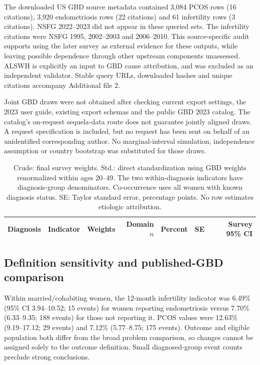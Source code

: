 \documentclass[11pt,a4paper]{article}
\begin{document}
The downloaded US GBD source metadata contained 3,084 PCOS rows (16 citations), 3,920 endometriosis rows (22 citations) and 61 infertility rows (3 citations). NSFG 2022--2023 did not appear in these queried sets. The infertility citations were NSFG 1995, 2002--2003 and 2006--2010. This source-specific audit supports using the later survey as external evidence for these outputs, while leaving possible dependence through other upstream components unassessed. ALSWH is explicitly an input to GBD cause attribution, and was excluded as an independent validator. Stable query URLs, downloaded hashes and unique citations accompany Additional file 2.

Joint GBD draws were not obtained after checking current export settings, the 2023 user guide, existing export schemas and the public GBD 2023 catalog. The catalog's on-request sequela-data route does not guarantee jointly aligned draws. A request specification is included, but no request has been sent on behalf of an unidentified corresponding author. No marginal-interval simulation, independence assumption or country bootstrap was substituted for those draws.

\begin{table}[htbp]\centering\scriptsize
\caption{Extended NSFG survey estimates and sampling uncertainty.}
\setlength{\tabcolsep}{3pt}
\begin{tabular}{lllrrrr}\toprule
Diagnosis & Indicator & Weights & Domain $n$ & Percent & SE & Survey 95\% CI\\\midrule
\end{tabular}
\caption*{Crude: final survey weights. Std.: direct standardization using GBD weights renormalized within ages 20--49. The two within-diagnosis indicators have diagnosis-group denominators. Co-occurrence uses all women with known diagnosis status. SE: Taylor standard error, percentage points. No row estimates etiologic attribution.}
\end{table}

\subsection{Definition sensitivity and published-GBD comparison}
Within married/cohabiting women, the 12-month infertility indicator was 6.49\% (95\% CI 3.94--10.52; 15 events) for women reporting endometriosis versus 7.70\% (6.33--9.35; 188 events) for those not reporting it. PCOS values were 12.63\% (9.19--17.12; 29 events) and 7.12\% (5.77--8.75; 175 events). Outcome and eligible population both differ from the broad problem comparison, so changes cannot be assigned solely to the outcome definition. Small diagnosed-group event counts preclude strong conclusions.
\end{document}

